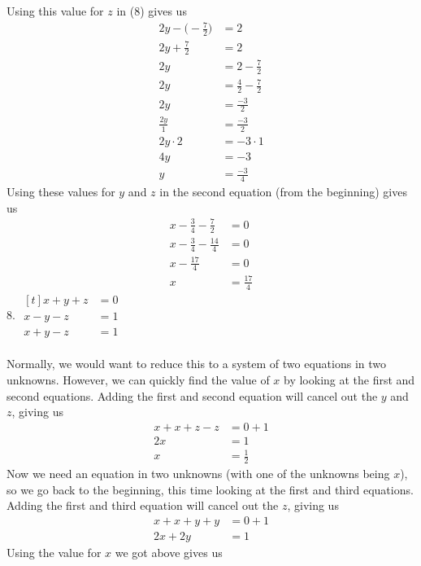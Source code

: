 \documentclass[12pt]{article}
\begin{document}
Using this value for $z$ in (8) gives us
\begin{align*}
2y-\bigg(-\displaystyle \frac{7}{2}\bigg)&=2 \\
2y+\displaystyle \frac{7}{2}&=2 \\
2y&=2-\displaystyle \frac{7}{2} \\
2y&=\displaystyle \frac{4}{2}-\displaystyle \frac{7}{2} \\
2y&=\displaystyle \frac{-3}{2} \\
\displaystyle \frac{2y}{1}&=\displaystyle \frac{-3}{2} \\
2y\cdot2&=-3\cdot1 \\
4y&=-3 \\
y&=\displaystyle \frac{-3}{4}
\end{align*}
Using these values for $y$ and $z$ in the second equation (from the beginning) gives us
\begin{align*}
x-\displaystyle \frac{3}{4}-\displaystyle \frac{7}{2}&=0 \\
x-\displaystyle \frac{3}{4}-\displaystyle \frac{14}{4}&=0 \\
x-\displaystyle \frac{17}{4}&=0 \\
x&=\displaystyle \frac{17}{4}
\end{align*}
\setcounter{equation}{0}
8. $\begin{aligned}[t]
x+y+z&=0 \\
x-y-z&=1 \\
x+y-z&=1
\end{aligned}$ \\
\\
Normally, we would want to reduce this to a system of two equations in two unknowns. However, we can quickly find the value of $x$ by looking at the first and second equations. Adding the first and second equation will cancel out the $y$ and $z$, giving us
\begin{align*}
x+x+z-z&=0+1 \\
2x&=1 \\
x&=\displaystyle \frac{1}{2}
\end{align*}
Now we need an equation in two unknowns (with one of the unknowns being $x$), so we go back to the beginning, this time looking at the first and third equations. \\
Adding the first and third equation will cancel out the $z$, giving us
\begin{align*}
x+x+y+y&=0+1 \\
2x+2y&=1
\end{align*}
Using the value for $x$ we got above gives us
\end{document}
